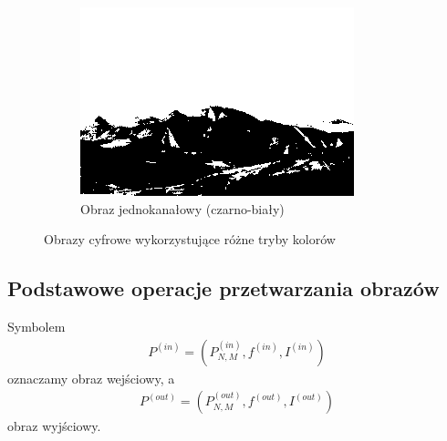 \begin{figure}
\begin{subfigure}[b]{0.45\textwidth}
    \includegraphics[width=\textwidth]{img/basics-image-binary}
    \caption{Obraz jednokanałowy (czarno-biały)}
    \label{fig:basics_image_binary}
  \end{subfigure}
  \caption{Obrazy cyfrowe wykorzystujące różne tryby kolorów}\label{fig:image_examples}
\end{figure}
\subsection{Podstawowe operacje przetwarzania obrazów}
Symbolem
\begin{gather*}
  P^{(in)} = (P_{N,M}^{(in)}, f^{(in)}, I^{(in)})
\end{gather*}
oznaczamy obraz wejściowy, a 
\begin{gather*}
  P^{(out)} = (P_{N,M}^{(out)}, f^{(out)}, I^{(out)})
\end{gather*}
obraz wyjściowy.

